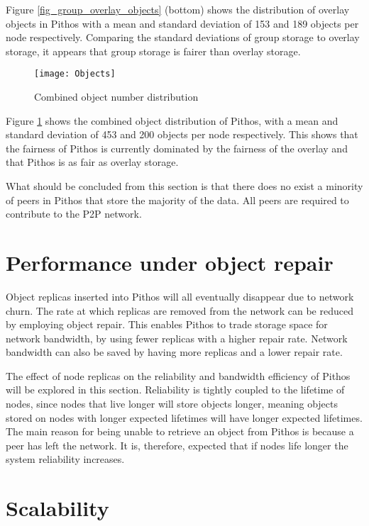 Figure \ref{fig_group_overlay_objects} (bottom) shows the distribution of overlay objects in Pithos with a mean and standard deviation of 153 and 189 objects per node respectively. Comparing the standard deviations of group storage to overlay storage, it appears that group storage is fairer than overlay storage.

\begin{figure}[htbp]
 \centering
 \texttt{[image: Objects]}
 \caption{Combined object number distribution}
 \label{fig_objects}
\end{figure}
%
Figure \ref{fig_objects} shows the combined object distribution of Pithos, with a mean and standard deviation of 453 and 200 objects per node respectively. This shows that the fairness of Pithos is currently dominated by the fairness of the overlay and that Pithos is as fair as overlay storage.

What should be concluded from this section is that there does no exist a minority of peers in Pithos that store the majority of the data. All peers are required to contribute to the P2P network.

\section{Performance under object repair}
\label{repair_results}

Object replicas inserted into Pithos will all eventually disappear due to network churn. The rate at which replicas are removed from the network can be reduced by employing object repair. This enables Pithos to trade storage space for network bandwidth, by using fewer replicas with a higher repair rate. Network bandwidth can also be saved by having more replicas and a lower repair rate.

The effect of node replicas on the reliability and bandwidth efficiency of Pithos will be explored in this section. Reliability is tightly coupled to the lifetime of nodes, since nodes that live longer will store objects longer, meaning objects stored on nodes with longer expected lifetimes will have longer expected lifetimes. The main reason for being unable to retrieve an object from Pithos is because a peer has left the network. It is, therefore, expected that if nodes life longer the system reliability increases.

\section{Scalability}

